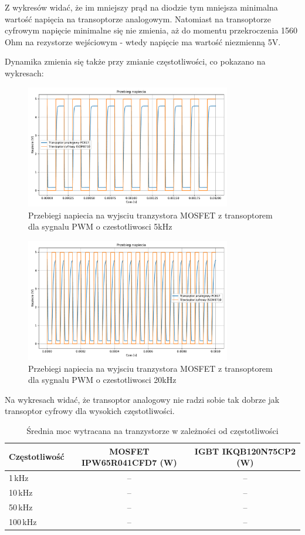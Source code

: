 \documentclass[11pt]{article}
\begin{document}
Z wykresów widać, że im mniejszy prąd na diodzie tym mniejsza minimalna wartość napięcia na transoptorze analogowym. Natomiast na transoptorze cyfrowym napięcie minimalne się nie zmienia, aż do momentu przekroczenia 1560 Ohm na rezystorze wejściowym - wtedy napięcie ma wartość niezmienną 5V.

Dynamika zmienia się także przy zmianie częstotliwości, co pokazano na wykresach:

\begin{figure}[H]
\centering
\includegraphics[width=0.8\textwidth]{aun1_gate_circuit_digital_vs_analog_5khz.pdf}
\caption{Przebiegi napiecia na wyjsciu tranzystora MOSFET z transoptorem dla sygnalu PWM o czestotliwosci 5kHz}
\end{figure}

\begin{figure}[H]
\centering
\includegraphics[width=0.8\textwidth]{aun1_gate_circuit_digital_vs_analog_20khz.pdf}
\caption{Przebiegi napiecia na wyjsciu tranzystora MOSFET z transoptorem dla sygnalu PWM o czestotliwosci 20kHz}
\end{figure}

Na wykresach widać, że transoptor analogowy nie radzi sobie tak dobrze jak transoptor cyfrowy dla wysokich częstotliwości.

\begin{table}[H]
\centering
\begin{tabular}{|l|c|c|}
\hline
\textbf{Częstotliwość} & \textbf{MOSFET IPW65R041CFD7 (W)} & \textbf{IGBT IKQB120N75CP2 (W)} \\
\hline
1\,kHz & -- & -- \\
\hline
10\,kHz & -- & -- \\
\hline
50\,kHz & -- & -- \\
\hline
100\,kHz & -- & -- \\
\hline
\end{tabular}
\caption{Średnia moc wytracana na tranzystorze w zależności od częstotliwości}
\end{table}
\end{document}
